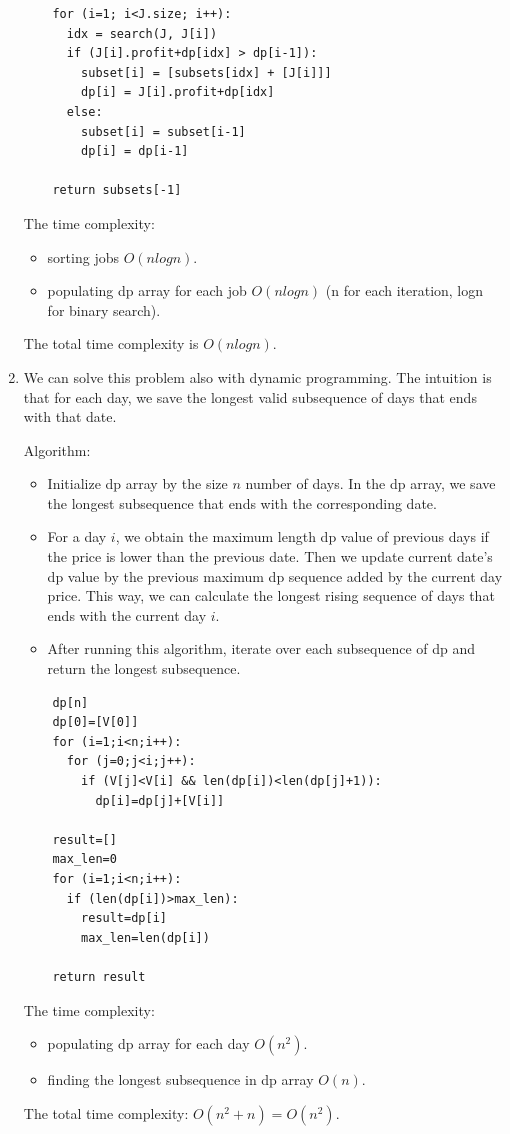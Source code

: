 \documentclass{article}
\begin{document}
\begin{enumerate}
\begin{lstlisting}
    for (i=1; i<J.size; i++):
      idx = search(J, J[i])
      if (J[i].profit+dp[idx] > dp[i-1]):
        subset[i] = [subsets[idx] + [J[i]]]
        dp[i] = J[i].profit+dp[idx]
      else:
        subset[i] = subset[i-1]
        dp[i] = dp[i-1]
    
    return subsets[-1]
  \end{lstlisting}

  The time complexity:

  \begin{itemize}
    \item sorting jobs $O(nlogn)$.
    \item populating dp array for each job $O(nlogn)$ (n for each iteration, logn for binary search).
  \end{itemize}

  The total time complexity is $O(nlogn)$.

  \item We can solve this problem also with dynamic programming.
  The intuition is that for each day, we save the longest valid subsequence of days that ends with that date.
  
  Algorithm:

  \begin{itemize}
    \item Initialize dp array by the size $n$ number of days.
    In the dp array, we save the longest subsequence that ends with the corresponding date.
    \item For a day $i$, we obtain the maximum length dp value of previous days if the price is lower than the previous date.
    Then we update current date's dp value by the previous maximum dp sequence added by the current day price.
    This way, we can calculate the longest rising sequence of days that ends with the current day $i$.
    \item After running this algorithm, iterate over each subsequence of dp and return the longest subsequence.
  \end{itemize}

  \begin{lstlisting}
    dp[n]
    dp[0]=[V[0]]
    for (i=1;i<n;i++):
      for (j=0;j<i;j++):
        if (V[j]<V[i] && len(dp[i])<len(dp[j]+1)):
          dp[i]=dp[j]+[V[i]]
    
    result=[]
    max_len=0
    for (i=1;i<n;i++):
      if (len(dp[i])>max_len):
        result=dp[i]
        max_len=len(dp[i])
    
    return result
  \end{lstlisting}

  The time complexity:

  \begin{itemize}
    \item populating dp array for each day $O(n^2)$.
    \item finding the longest subsequence in dp array $O(n)$.
  \end{itemize}

  The total time complexity: $O(n^2+n)=O(n^2)$.

\end{enumerate}
\end{document}
